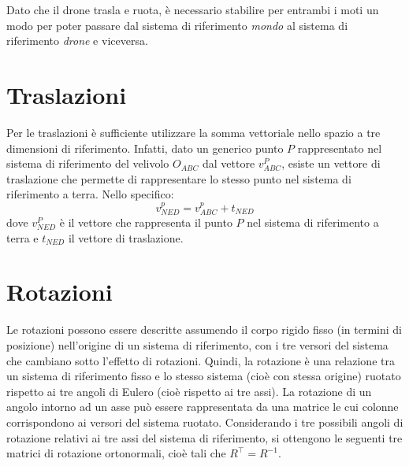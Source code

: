Dato che il drone trasla e ruota, è necessario stabilire per entrambi i moti un modo per poter passare dal sistema di riferimento \emph{mondo} al sistema di riferimento \emph{drone} e viceversa. 

\section*{Traslazioni}
Per le traslazioni è sufficiente utilizzare la somma vettoriale nello spazio a tre dimensioni di riferimento. Infatti, dato un generico punto $P$ rappresentato nel sistema di riferimento del velivolo $O_{ABC}$ dal vettore $v^P_{ABC}$, esiste un vettore di traslazione che permette di rappresentare lo stesso punto nel sistema di riferimento a terra. Nello specifico:
\[ v^p_{NED} = v^p_{ABC} + t_{NED} \]
dove $v^P_{NED}$ è il vettore che rappresenta il punto $P$ nel sistema di riferimento a terra e $t_{NED}$ il vettore di traslazione. 

\section*{Rotazioni}
Le rotazioni possono essere descritte assumendo il corpo rigido fisso (in termini di posizione) nell'origine di un sistema di riferimento, con i tre versori del sistema che cambiano sotto l'effetto di rotazioni. Quindi, la rotazione è una relazione tra un sistema di riferimento fisso e lo stesso sistema (cioè con stessa origine) ruotato rispetto ai tre angoli di Eulero (cioè rispetto ai tre assi). La rotazione di un angolo intorno ad un asse può essere rappresentata da una matrice le cui colonne corrispondono ai versori del sistema ruotato. Considerando i tre possibili angoli di rotazione relativi ai tre assi del sistema di riferimento, si ottengono le seguenti tre matrici di rotazione ortonormali, cioè tali che $R^\top = R^{-1}$.

